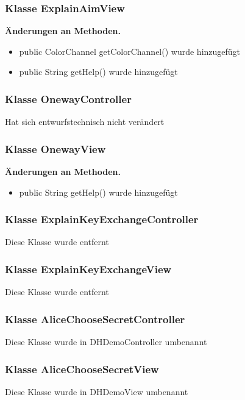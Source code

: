 \documentclass{article}
\begin{document}
	\subsubsection{Klasse ExplainAimView}
    \textbf{Änderungen an Methoden.}\newline
	   \begin{itemize}
           \item public ColorChannel getColorChannel() wurde hinzugefügt\newline
           \item public String getHelp() wurde hinzugefügt\newline
           \end{itemize}

	\subsubsection{Klasse OnewayController}
    Hat sich entwurfstechnisch nicht verändert

	\subsubsection{Klasse OnewayView}
    \textbf{Änderungen an Methoden.}\newline
	   \begin{itemize}
           \item public String getHelp() wurde hinzugefügt\newline
           \end{itemize}

	\subsubsection{Klasse ExplainKeyExchangeController}
    Diese Klasse wurde entfernt

	\subsubsection{Klasse ExplainKeyExchangeView}
    Diese Klasse wurde entfernt

	\subsubsection{Klasse AliceChooseSecretController}
    Diese Klasse wurde in DHDemoController umbenannt

	\subsubsection{Klasse AliceChooseSecretView}
    Diese Klasse wurde in DHDemoView umbenannt
\end{document}
